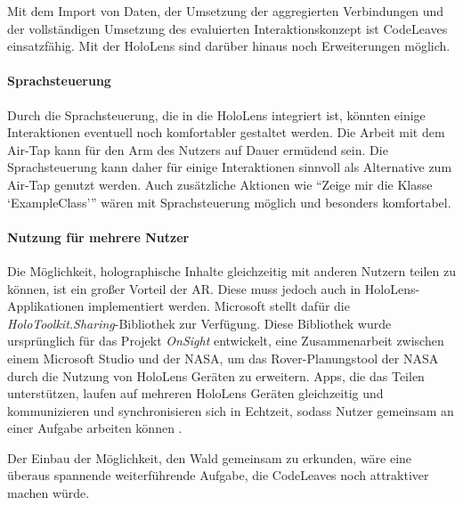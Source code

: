 Mit dem Import von Daten, der Umsetzung der aggregierten Verbindungen und der vollständigen Umsetzung des evaluierten Interaktionskonzept ist CodeLeaves einsatzfähig. Mit der HoloLens sind darüber hinaus noch Erweiterungen möglich.

\paragraph*{Sprachsteuerung}

Durch die Sprachsteuerung, die in die HoloLens integriert ist, könnten einige Interaktionen eventuell noch komfortabler gestaltet werden. Die Arbeit mit dem Air-Tap kann für den Arm des Nutzers auf Dauer ermüdend sein. Die Sprachsteuerung kann daher für einige Interaktionen sinnvoll als Alternative zum Air-Tap genutzt werden. Auch zusätzliche Aktionen wie "`Zeige mir die Klasse \enquote*{ExampleClass}"' wären mit Sprachsteuerung möglich und besonders komfortabel.

\paragraph*{Nutzung für mehrere Nutzer}
Die Möglichkeit, holographische Inhalte gleichzeitig mit anderen Nutzern teilen zu können, ist ein großer Vorteil der AR. Diese muss jedoch auch in HoloLens-Applikationen implementiert werden. Microsoft stellt dafür die \textit{HoloToolkit.Sharing}-Bibliothek zur Verfügung. Diese Bibliothek wurde ursprünglich für das Projekt \textit{OnSight} entwickelt, eine Zusammenarbeit zwischen einem Microsoft Studio und der NASA, um das Rover-Planungstool der NASA durch die Nutzung von HoloLens Geräten zu erweitern. Apps, die das Teilen unterstützen, laufen auf mehreren HoloLens Geräten gleichzeitig und kommunizieren und synchronisieren sich in Echtzeit, sodass Nutzer gemeinsam an einer Aufgabe arbeiten können \cite{microsoft2017sharing}.

Der Einbau der Möglichkeit, den Wald gemeinsam zu erkunden, wäre eine überaus spannende weiterführende Aufgabe, die CodeLeaves noch attraktiver machen würde.\\


